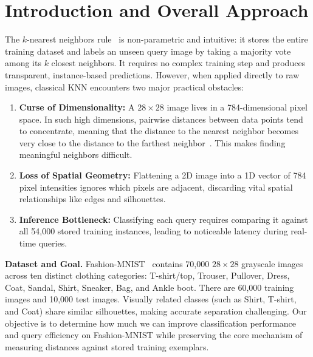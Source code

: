 \documentclass[10pt,a4paper]{article}
\begin{document}
\section{Introduction and Overall Approach}\label{sec:intro}
The $k$-nearest neighbors rule~\cite{cover1967} is non-parametric and intuitive: it stores the entire training dataset and labels an unseen query image by taking a majority vote among its $k$ closest neighbors. It requires no complex training step and produces transparent, instance-based predictions. However, when applied directly to raw images, classical KNN encounters two major practical obstacles:
\begin{enumerate}[leftmargin=1.4em]
\item \textbf{Curse of Dimensionality:} A $28\times28$ image lives in a 784-dimensional pixel space. In such high dimensions, pairwise distances between data points tend to concentrate, meaning that the distance to the nearest neighbor becomes very close to the distance to the farthest neighbor~\cite{beyer1999}. This makes finding meaningful neighbors difficult.
\item \textbf{Loss of Spatial Geometry:} Flattening a 2D image into a 1D vector of 784 pixel intensities ignores which pixels are adjacent, discarding vital spatial relationships like edges and silhouettes.
\item \textbf{Inference Bottleneck:} Classifying each query requires comparing it against all 54{,}000 stored training instances, leading to noticeable latency during real-time queries.
\end{enumerate}

\textbf{Dataset and Goal.} Fashion-MNIST~\cite{xiao2017} contains 70{,}000 $28\times28$ grayscale images across ten distinct clothing categories: T-shirt/top, Trouser, Pullover, Dress, Coat, Sandal, Shirt, Sneaker, Bag, and Ankle boot. There are 60{,}000 training images and 10{,}000 test images. Visually related classes (such as Shirt, T-shirt, and Coat) share similar silhouettes, making accurate separation challenging. Our objective is to determine how much we can improve classification performance and query efficiency on Fashion-MNIST while preserving the core mechanism of measuring distances against stored training exemplars.
\end{document}
